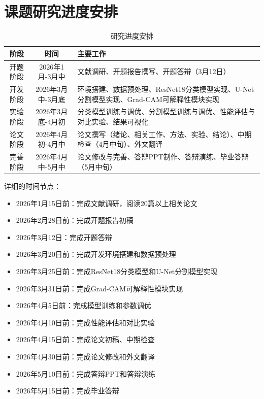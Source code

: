 \documentclass[supercite]{Hust-undergraduate-kaiti}
\theoremstyle{definition}
\begin{document}
\section{课题研究进度安排}

\begin{table}[htb]
\centering
\caption{研究进度安排}
\begin{tabular}{|c|c|p{8cm}|}
\hline
\textbf{阶段} & \textbf{时间} & \textbf{主要工作} \\ \hline
开题阶段 & 2026年1月-3月中 & 文献调研、开题报告撰写、开题答辩（3月12日） \\ \hline
开发阶段 & 2026年3月中-3月底 & 环境搭建、数据预处理、ResNet18分类模型实现、U-Net分割模型实现、Grad-CAM可解释性模块实现 \\ \hline
实验阶段 & 2026年3月底-4月初 & 分类模型训练与调优、分割模型训练与调优、性能评估与对比实验、结果可视化 \\ \hline
论文阶段 & 2026年4月初-4月中 & 论文撰写（绪论、相关工作、方法、实验、结论）、中期检查（4月中旬）、外文翻译 \\ \hline
完善阶段 & 2026年4月中-5月中 & 论文修改与完善、答辩PPT制作、答辩演练、毕业答辩（5月中旬） \\ \hline
\end{tabular}
\end{table}

详细的时间节点：
\begin{itemize}
    \item 2026年1月15日前：完成文献调研，阅读20篇以上相关论文
    \item 2026年2月28日前：完成开题报告初稿
    \item 2026年3月12日：完成开题答辩
    \item 2026年3月20日前：完成开发环境搭建和数据预处理
    \item 2026年3月25日前：完成ResNet18分类模型和U-Net分割模型实现
    \item 2026年3月31日前：完成Grad-CAM可解释性模块实现
    \item 2026年4月5日前：完成模型训练和参数调优
    \item 2026年4月10日前：完成性能评估和对比实验
    \item 2026年4月15日前：完成论文初稿、中期检查
    \item 2026年4月30日前：完成论文修改和外文翻译
    \item 2026年5月10日前：完成答辩PPT和答辩演练
    \item 2026年5月15日前：完成毕业答辩
\end{itemize}
\end{document}
